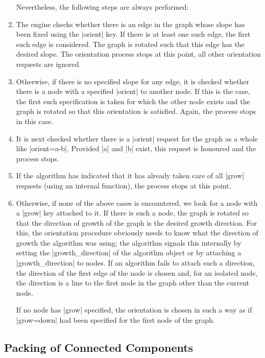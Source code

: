 \begin{enumerate}
  Nevertheless, the following steps are always performed:
\item
  The engine checks whether there is an edge in the graph whose
  slope has been fixed using the |orient| key. If there is at least one
  such edge, the first such edge is considered. The graph is rotated
  such that this edge has the desired slope. The orientation process
  stops at this point, all other orientation requests are ignored.
\item
  Otherwise, if there is no specified slope for any edge, it is
  checked whether there is a node with a specified |orient| to another
  node. If this is the case, the first such specification is taken for
  which the other node exists and the graph is rotated so that this
  orientation is satisfied. Again, the process stops in this case.
\item
  It is next checked whether there is a |orient| request for the graph
  as a whole like |orient=a-b|. Provided |a| and |b| exist, this
  request is honoured and the process stops.
\item
  If the algorithm has indicated that it has already taken care of all
  |grow| requests (using an internal function), the process stops at
  this point.
\item
  Otherwise, if none of the above cases is encountered, we look for
  a node with a |grow| key attached to it. If there is such a node,
  the graph is rotated so that the direction of growth of the graph is
  the desired growth direction. For this, the orientation procedure
  obviously needs to know what the direction of growth the algorithm
  was using; the algorithm signals this internally by setting the
  |growth_direction| of the algorithm object or by attaching a
  |growth_direction| to nodes. If an algorithm fails to attach such a
  direction, the direction of the first edge of the node is chosen
  and, for an isolated node, the direction is a line to the first node
  in the graph other than the current node.
  
  If no node has |grow| specified, the orientation is chosen in such a
  way as if |grow=down| had been specified for the first node of the
  graph.   
\end{enumerate}



\subsection{Packing of Connected Components}

